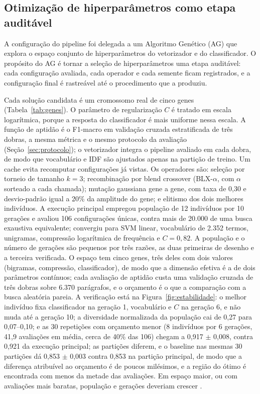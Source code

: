 \documentclass[fleqn,10pt]{SelfArx}
\begin{document}
\subsection{Otimização de hiperparâmetros como etapa auditável}

A configuração do pipeline foi delegada a um Algoritmo Genético (AG) que explora o espaço conjunto de hiperparâmetros do vetorizador e do classificador. O propósito do AG é tornar a seleção de hiperparâmetros uma etapa auditável: cada configuração avaliada, cada operador e cada semente ficam registrados, e a configuração final é rastreável até o procedimento que a produziu.

Cada solução candidata é um cromossomo real de cinco genes (Tabela~\ref{tab:genes}). O parâmetro de regularização $C$ é tratado em escala logarítmica, porque a resposta do classificador é mais uniforme nessa escala. A função de aptidão é o F1-macro em validação cruzada estratificada de três dobras, a mesma métrica e o mesmo protocolo da avaliação (Seção~\ref{sec:protocolo}); o vetorizador integra o pipeline avaliado em cada dobra, de modo que vocabulário e IDF são ajustados apenas na partição de treino. Um cache evita recomputar configurações já vistas. Os operadores são: seleção por torneio de tamanho $k = 3$; recombinação por blend crossover (BLX-$\alpha$, com $\alpha$ sorteado a cada chamada); mutação gaussiana gene a gene, com taxa de 0,30 e desvio-padrão igual a 20\% da amplitude do gene; e elitismo dos dois melhores indivíduos. A execução principal empregou população de 12 indivíduos por 10 gerações e avaliou 106 configurações únicas, contra mais de 20.000 de uma busca exaustiva equivalente; convergiu para SVM linear, vocabulário de 2.352 termos, unigramas, compressão logarítmica de frequência e $C = 0{,}82$. A população e o número de gerações são pequenos por três razões, as duas primeiras de desenho e a terceira verificada. O espaço tem cinco genes, três deles com dois valores (bigramas, compressão, classificador), de modo que a dimensão efetiva é a de dois parâmetros contínuos; cada avaliação de aptidão custa uma validação cruzada de três dobras sobre 6.370 parágrafos, e o orçamento é o que a comparação com a busca aleatória pareia. A verificação está na Figura~\ref{fig:estabilidade}: o melhor indivíduo fixa classificador na geração 1, vocabulário e $C$ na geração 6, e não muda até a geração 10; a diversidade normalizada da população cai de 0,27 para 0,07--0,10; e as 30 repetições com orçamento menor (8 indivíduos por 6 gerações, 41,9 avaliações em média, cerca de 40\% das 106) chegam a 0,917 $\pm$ 0,008, contra 0,921 da execução principal; as partições diferem, e o baseline nas mesmas 30 partições dá 0,853 $\pm$ 0,003 contra 0,853 na partição principal, de modo que a diferença atribuível ao orçamento é de poucos milésimos, e a região do ótimo é encontrada com menos da metade das avaliações. Em espaço maior, ou com avaliações mais baratas, população e gerações deveriam crescer \cite{bischl2023}.
\end{document}
